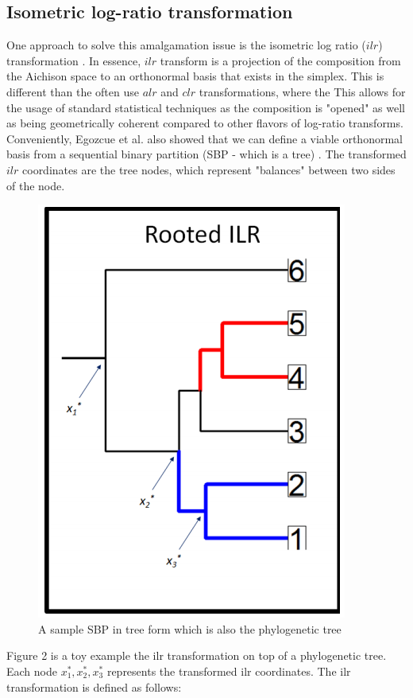 \documentclass{article}
\begin{document}
\subsection{Isometric log-ratio transformation}
One approach to solve this amalgamation issue is the isometric log ratio ($ilr$) transformation \cite{egozcue2003}. In essence, $ilr$ transform is a projection of the composition from the Aichison space to an orthonormal basis that exists in the simplex. This is different than the often use $alr$ and $clr$ transformations, where the This allows for the usage of standard statistical techniques as the composition is "opened" as well as being geometrically coherent compared to other flavors of log-ratio transforms. Conveniently, Egozcue et al. also showed that we can define a viable orthonormal basis from a sequential binary partition (SBP - which is a tree) \cite{egozcue2003}. The transformed $ilr$ coordinates are the tree nodes, which represent "balances" between two sides of the node. 
\begin{figure}[!htb]
    \centering
    \includegraphics[scale = 0.5]{figures/phylogeny_demonstration.png}
    \caption{A sample SBP in tree form which is also the phylogenetic tree}
    \label{fig:figures/phylogeny_demonstration}
\end{figure}
Figure 2 is a toy example the ilr transformation on top of a phylogenetic tree. Each node $x_1^*, x_2^*, x_3^*$ represents the transformed ilr coordinates. The ilr transformation is defined as follows:
\end{document}
